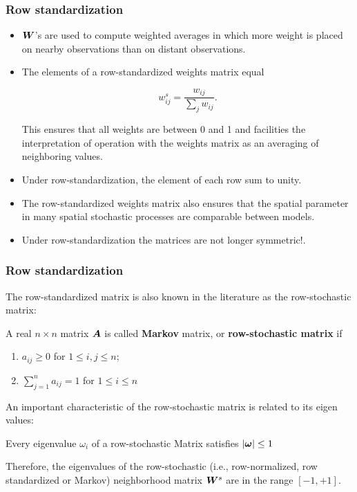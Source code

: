 \documentclass[english,10pt]{beamer}\usepackage[]{graphicx}\usepackage[]{xcolor}
\begin{document}
\begin{frame}
  \frametitle{Row standardization}
    \begin{itemize}
      \item $\bm W$'s are used to compute \alert{weighted averages} in which more weight is placed on nearby observations than on distant observations.
      \item The elements of a row-standardized weights matrix equal

\begin{equation*}
w_{ij}^s = \frac{w_{ij}}{\sum_j w_{ij}}.
\end{equation*}

This ensures that all weights are between 0 and 1 and facilities the interpretation of operation with the weights matrix as an averaging of neighboring values. 
\item Under row-standardization, the element of each \alert{row sum} to unity.  
\item The row-standardized weights matrix also ensures that the \alert{spatial parameter} in many spatial stochastic processes are comparable between models.
\item Under row-standardization the matrices are not longer \alert{symmetric}!.
\end{itemize}
\end{frame}

\begin{frame}
  \frametitle{Row standardization}
  The row-standardized matrix is also known in the literature as the row-stochastic matrix:
  
  \begin{definition}
	A real $n\times n$ matrix $\bm A$ is called \textbf{Markov} matrix, or \textbf{row-stochastic matrix} if 
		\begin{enumerate}
			\item $a_{ij} \geq 0$ for $1\leq i, j \leq n$;
			\item $\sum_{j=1}^n a_{ij} = 1$ for $1\leq i \leq n$
		\end{enumerate}
\end{definition}

An important characteristic of the row-stochastic matrix is related to its eigen values:

\begin{theorem}\label{teo:eigen_values}
	Every eigenvalue $\omega_i$ of a row-stochastic Matrix satisfies $\left|\bm \omega\right|\leq 1$
\end{theorem}

Therefore, the eigenvalues of the row-stochastic (i.e., row-normalized, row standardized or Markov) neighborhood matrix $\bm W^s$ are in the range $\left[-1, +1\right]$.
\end{frame}
\end{document}
